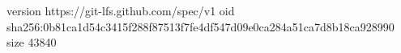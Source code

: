 version https://git-lfs.github.com/spec/v1
oid sha256:0b81ca1d54c3415f288f87513f7fe4df547d09e0ca284a51ca7d8b18ca928990
size 43840
